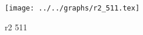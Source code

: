 \begin{figure}[h] \centering \texttt{[image: ../../graphs/r2\_511.tex]}\caption{r2 511}\label{gr:r2_511} \end{figure}
